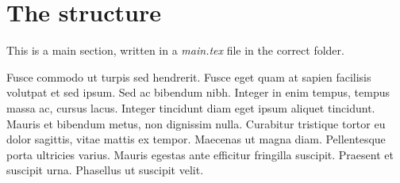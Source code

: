 \newpage
\section{The structure}
\label{sec:structure}



This is a main section, written in a \textit{main.tex} file in the correct folder. 

\medskip Fusce commodo ut turpis sed hendrerit. Fusce eget quam at sapien facilisis volutpat et sed ipsum. Sed ac bibendum nibh. Integer in enim tempus, tempus massa ac, cursus lacus. Integer tincidunt diam eget ipsum aliquet tincidunt. Mauris et bibendum metus, non dignissim nulla. Curabitur tristique tortor eu dolor sagittis, vitae mattis ex tempor. Maecenas ut magna diam. Pellentesque porta ultricies varius. Mauris egestas ante efficitur fringilla suscipit. Praesent et suscipit urna. Phasellus ut suscipit velit.